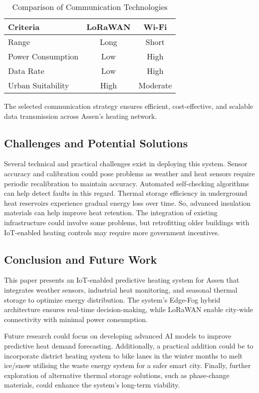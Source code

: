 \documentclass{article}
\begin{document}
\begin{table}[h]
\centering
\caption{Comparison of Communication Technologies}
\begin{tabular}{|l|c|c|}
\hline
\textbf{Criteria} & \textbf{LoRaWAN} & \textbf{Wi-Fi} \\
\hline
Range & Long & Short \\
Power Consumption & Low & High \\
Data Rate & Low & High \\
Urban Suitability & High & Moderate \\
\hline
\end{tabular}
\end{table}

The selected communication strategy ensures efficient, cost-effective, and scalable data transmission across Assen’s heating network.

\subsection{Challenges and Potential Solutions}

Several technical and practical challenges exist in deploying this system. Sensor accuracy and calibration could pose problems as weather and heat sensors require periodic recalibration to maintain accuracy. Automated self-checking algorithms can help detect faults in this regard. Thermal storage efficiency in underground heat reservoirs experience gradual energy loss over time. So, advanced insulation materials can help improve heat retention. The integration of existing infrastructure could involve some problems, but retrofitting older buildings with IoT-enabled heating controls may require more government incentives.

\subsection{Conclusion and Future Work}

This paper presents an IoT-enabled predictive heating system for Assen that integrates weather sensors, industrial heat monitoring, and seasonal thermal storage to optimize energy distribution. The system’s Edge-Fog hybrid architecture ensures real-time decision-making, while LoRaWAN enable city-wide connectivity with minimal power consumption.

Future research could focus on developing advanced AI models to improve predictive heat demand forecasting. Additionally, a practical addition could be to incorporate district heating system to bike lanes in the winter months to melt ice/snow utilising the waste energy system for a safer smart city. Finally, further exploration of alternative thermal storage solutions, such as phase-change materials, could enhance the system’s long-term viability.



\end{document}
